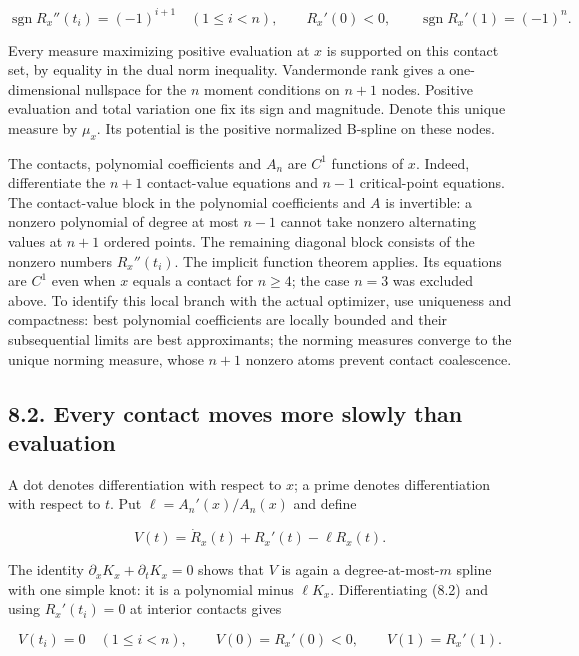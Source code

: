 \documentclass[11pt]{article}
\begin{document}
\[
\operatorname{sgn}R_x''(t_i)=(-1)^{i+1}\quad(1\le i<n),
\qquad R_x'(0)<0,\qquad
\operatorname{sgn}R_x'(1)=(-1)^n.
\tag{8.3}
\]

Every measure maximizing positive evaluation at \(x\) is supported on
this contact set, by equality in the dual norm inequality. Vandermonde
rank gives a one-dimensional nullspace for the \(n\) moment conditions
on \(n+1\) nodes. Positive evaluation and total variation one fix its
sign and magnitude. Denote this unique measure by \(\mu_x\). Its
potential is the positive normalized B-spline on these nodes.

The contacts, polynomial coefficients and \(A_n\) are \(C^1\) functions
of \(x\). Indeed, differentiate the \(n+1\) contact-value equations and
\(n-1\) critical-point equations. The contact-value block in the
polynomial coefficients and \(A\) is invertible: a nonzero polynomial of
degree at most \(n-1\) cannot take nonzero alternating values at \(n+1\)
ordered points. The remaining diagonal block consists of the nonzero
numbers \(R_x''(t_i)\). The implicit function theorem applies. Its
equations are \(C^1\) even when \(x\) equals a contact for \(n\ge4\);
the case \(n=3\) was excluded above. To identify this local branch with
the actual optimizer, use uniqueness and compactness: best polynomial
coefficients are locally bounded and their subsequential limits are best
approximants; the norming measures converge to the unique norming
measure, whose \(n+1\) nonzero atoms prevent contact coalescence.

\subsection{8.2. Every contact moves more slowly than
evaluation}\label{every-contact-moves-more-slowly-than-evaluation}

A dot denotes differentiation with respect to \(x\); a prime denotes
differentiation with respect to \(t\). Put \(\ell=A_n'(x)/A_n(x)\) and
define

\[
V(t)=\dot R_x(t)+R_x'(t)-\ell R_x(t).
\tag{8.4}
\]

The identity \(\partial_xK_x+\partial_tK_x=0\) shows that \(V\) is again
a degree-at-most-\(m\) spline with one simple knot: it is a polynomial
minus \(\ell K_x\). Differentiating (8.2) and using \(R_x'(t_i)=0\) at
interior contacts gives

\[
V(t_i)=0\quad(1\le i<n),\qquad
V(0)=R_x'(0)<0,\qquad V(1)=R_x'(1).
\tag{8.5}
\]
\end{document}
